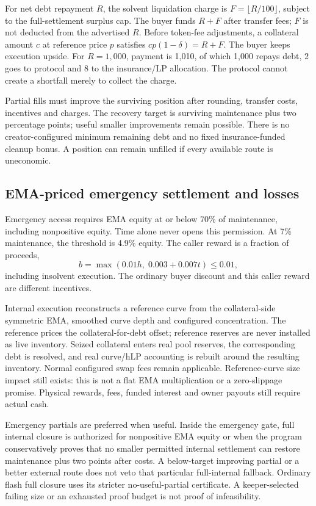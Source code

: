 For net debt repayment $R$, the solvent liquidation charge is $F=\lfloor R/100\rfloor$, subject to the full-settlement surplus cap. The buyer funds $R+F$ after transfer fees; $F$ is not deducted from the advertised $R$. Before token-fee adjustments, a collateral amount $c$ at reference price $p$ satisfies $cp(1-\delta)=R+F$. The buyer keeps execution upside. For $R=1{,}000$, payment is 1,010, of which 1,000 repays debt, 2 goes to protocol and 8 to the insurance/LP allocation. The protocol cannot create a shortfall merely to collect the charge.

Partial fills must improve the surviving position after rounding, transfer costs, incentives and charges. The recovery target is surviving maintenance plus two percentage points; useful smaller improvements remain possible. There is no creator-configured minimum remaining debt and no fixed insurance-funded cleanup bonus. A position can remain unfilled if every available route is uneconomic.

\subsection{EMA-priced emergency settlement and losses}
\label{sec:emergency}

Emergency access requires EMA equity at or below 70\% of maintenance, including nonpositive equity. Time alone never opens this permission. At 7\% maintenance, the threshold is 4.9\% equity. The caller reward is a fraction of proceeds,
\[
b=\max(0.01h,\;0.003+0.007t)\le0.01,
\]
including insolvent execution. The ordinary buyer discount and this caller reward are different incentives.

Internal execution reconstructs a reference curve from the collateral-side symmetric EMA, smoothed curve depth and configured concentration. The reference prices the collateral-for-debt offset; reference reserves are never installed as live inventory. Seized collateral enters real pool reserves, the corresponding debt is resolved, and real curve/hLP accounting is rebuilt around the resulting inventory. Normal configured swap fees remain applicable. Reference-curve size impact still exists: this is not a flat EMA multiplication or a zero-slippage promise. Physical rewards, fees, funded interest and owner payouts still require actual cash.

Emergency partials are preferred when useful. Inside the emergency gate, full internal closure is authorized for nonpositive EMA equity or when the program conservatively proves that no smaller permitted internal settlement can restore maintenance plus two points after costs. A below-target improving partial or a better external route does not veto that particular full-internal fallback. Ordinary flash full closure uses its stricter no-useful-partial certificate. A keeper-selected failing size or an exhausted proof budget is not proof of infeasibility.

